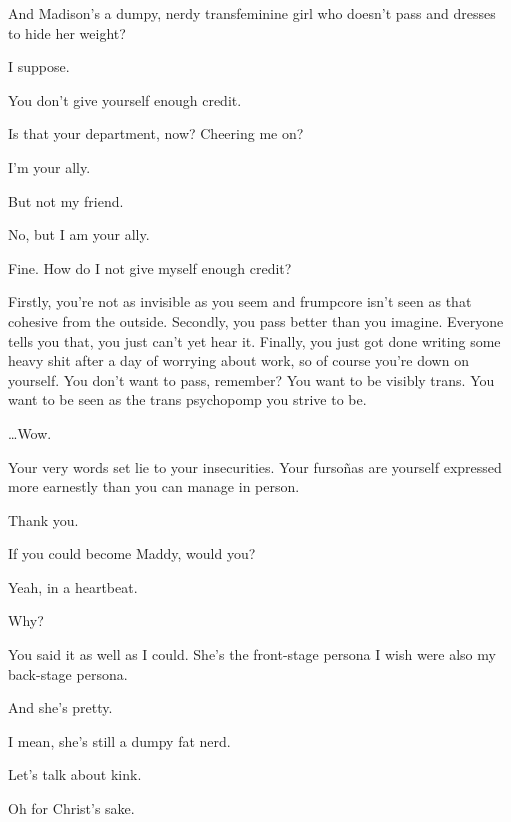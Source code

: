 \begin{paracol}{2}
\begin{leftcolumn}
\begin{ally}
And Madison's a dumpy, nerdy transfeminine girl who doesn't pass and dresses to hide her weight?
\end{ally}
I suppose.

\begin{ally}
You don't give yourself enough credit.
\end{ally}
Is that your department, now? Cheering me on?

\begin{ally}
I'm your ally.
\end{ally}
But not my friend.

\begin{ally}
No, but I am your ally.
\end{ally}
Fine. How do I not give myself enough credit?

\begin{ally}
Firstly, you're not as invisible as you seem and frumpcore isn't seen as that cohesive from the outside. Secondly, you pass better than you imagine. Everyone tells you that, you just can't yet hear it. Finally, you just got done writing some heavy shit after a day of worrying about work, so of course you're down on yourself. You don't want to pass, remember? You want to be visibly trans. You want to be seen as the trans psychopomp you strive to be.
\end{ally}
\ldots{}Wow.

\begin{ally}
Your very words set lie to your insecurities. Your fursoñas are yourself expressed more earnestly than you can manage in person.
\end{ally}
Thank you.

\begin{ally}
If you could become Maddy, would you?
\end{ally}
Yeah, in a heartbeat.

\begin{ally}
Why?
\end{ally}
You said it as well as I could. She's the front-stage persona I wish were also my back-stage persona.

\begin{ally}
And she's pretty.
\end{ally}
I mean, she's still a dumpy fat nerd.

\begin{ally}
Let's talk about kink.
\end{ally}
Oh for Christ's sake.
\newpage


\end{leftcolumn}
\end{paracol}
